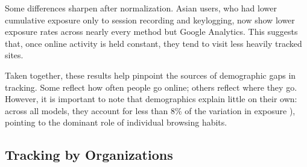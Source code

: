 \documentclass[12pt, letterpaper]{article}
\begin{document}
Some differences sharpen after normalization.  Asian users, who had lower cumulative exposure only to session recording and keylogging, now show lower exposure rates across nearly every method but Google Analytics. This suggests that, once online activity is held constant, they tend to visit less heavily tracked sites.

Taken together, these results help pinpoint the sources of demographic gaps in tracking. Some reflect how often people go online; others reflect where they go. However, it is important to note that demographics explain little on their own: across all models, they account for less than 8\% of the variation in exposure  ), pointing to the dominant role of individual browsing habits.

\subsection{Tracking by Organizations}
\label{sec:tracker_organizations}
\end{document}
